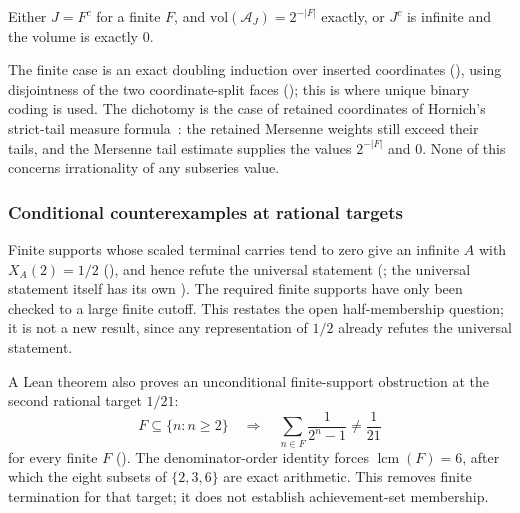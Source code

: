 \begin{prop}\label{prop:exact-lebesgue-measure-dichotomy}
Either $J=F^c$ for a finite $F$, and $\mathrm{vol}(\mathcal A_J)=2^{-|F|}$
exactly, or $J^c$ is infinite and the volume is exactly $0$.
\end{prop}
The finite case is an exact doubling induction over inserted
coordinates (),
using disjointness of the two coordinate-split faces
();
this is where unique binary coding is used. The dichotomy is the case of retained coordinates of
Hornich's strict-tail measure formula~\cite[Theorem~4(1), p.~9]{nitecki2013}: the retained Mersenne
weights still exceed their tails, and the Mersenne tail estimate supplies the values $2^{-|F|}$ and
$0$.  None of this concerns irrationality of any subseries value.

\subsubsection{Conditional counterexamples at rational targets}

Finite supports whose scaled terminal carries tend to zero give an infinite $A$ with
$X_{A}(2)=1/2$
(),
and hence refute the universal statement
(;
the universal statement itself has its own
).
The required finite supports have only been checked to a large finite cutoff.  This restates
the open half-membership question; it is not a new result, since any representation of $1/2$
already refutes the universal statement.

A Lean theorem also proves an unconditional finite-support obstruction at
the second rational target $1/21$:
\[
  F\subseteq\{n:n\ge2\}\quad\Longrightarrow\quad
  \sum_{n\in F}\frac1{2^n-1}\ne\frac1{21}
\]
for every finite $F$
().
The denominator-order identity forces
$\operatorname{lcm}(F)=6$, after which the eight subsets of $\{2,3,6\}$ are exact arithmetic.
This removes finite termination for that target; it does not establish achievement-set membership.

